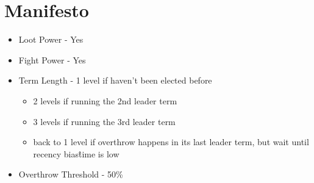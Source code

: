 \pagebreak

\section{Manifesto}
\begin{itemize}
    \item Loot Power - Yes
    \item Fight Power - Yes
    \item Term Length -  1 level if haven't been elected before
          \begin{itemize}
              \item 2 levels if running the 2nd leader term
              \item 3 levels if running the 3rd leader term
              \item back to 1 level if overthrow happens in its last leader term, but wait until recency bias\^time is low
          \end{itemize}
    \item Overthrow Threshold - 50\%
\end{itemize}


